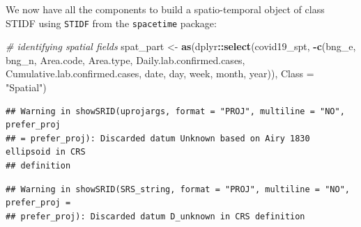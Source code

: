 \documentclass[
]{book}
\newenvironment{Shaded}{\begin{snugshade}}{\end{snugshade}}
\newcommand{\CommentTok}[1]{\textcolor[rgb]{0.56,0.35,0.01}{\textit{#1}}}
\newcommand{\DataTypeTok}[1]{\textcolor[rgb]{0.13,0.29,0.53}{#1}}
\newcommand{\KeywordTok}[1]{\textcolor[rgb]{0.13,0.29,0.53}{\textbf{#1}}}
\newcommand{\NormalTok}[1]{#1}
\newcommand{\OperatorTok}[1]{\textcolor[rgb]{0.81,0.36,0.00}{\textbf{#1}}}
\newcommand{\StringTok}[1]{\textcolor[rgb]{0.31,0.60,0.02}{#1}}
\begin{document}
We now have all the components to build a spatio-temporal object of class STIDF using \texttt{STIDF} from the \texttt{spacetime} package:

\begin{Shaded}
\begin{Highlighting}[]
\CommentTok{# identifying spatial fields}
\NormalTok{spat_part <-}\StringTok{ }\KeywordTok{as}\NormalTok{(dplyr}\OperatorTok{::}\KeywordTok{select}\NormalTok{(covid19_spt, }\OperatorTok{-}\KeywordTok{c}\NormalTok{(bng_e, bng_n, Area.code, Area.type, Daily.lab.confirmed.cases, Cumulative.lab.confirmed.cases, date, day, week, month, year)), }\DataTypeTok{Class =} \StringTok{"Spatial"}\NormalTok{)}
\end{Highlighting}
\end{Shaded}

\begin{verbatim}
## Warning in showSRID(uprojargs, format = "PROJ", multiline = "NO", prefer_proj
## = prefer_proj): Discarded datum Unknown based on Airy 1830 ellipsoid in CRS
## definition
\end{verbatim}

\begin{verbatim}
## Warning in showSRID(SRS_string, format = "PROJ", multiline = "NO", prefer_proj =
## prefer_proj): Discarded datum D_unknown in CRS definition
\end{verbatim}

\begin{Shaded}
\end{Shaded}
\end{document}
